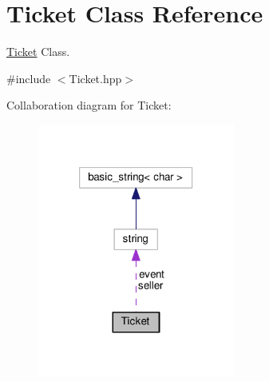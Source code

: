 \hypertarget{class_ticket}{\section{Ticket Class Reference}
\label{class_ticket}
}


\hyperlink{class_ticket}{Ticket} Class.  




{\ttfamily \#include $<$Ticket.\-hpp$>$}



Collaboration diagram for Ticket\-:
\nopagebreak
\begin{figure}[H]
\begin{center}
\leavevmode
\includegraphics[width=184pt]{class_ticket__coll__graph}
\end{center}
\end{figure}
